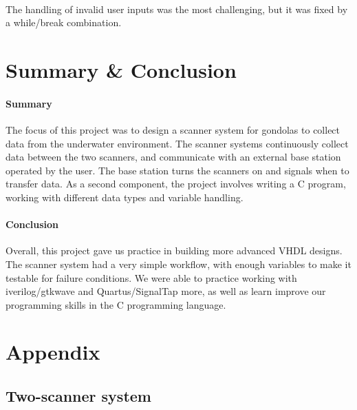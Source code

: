 \documentclass{article}
\begin{document}
  \paragraph{} The handling of invalid user inputs was the most challenging, but it was fixed by a while/break combination.


\section{Summary \& Conclusion}
  \paragraph{Summary} The focus of this project was to design a scanner system for gondolas to collect data from the underwater environment. The scanner systems continuously collect data between the two scanners, and communicate with an external base station operated by the user. The base station turns the scanners on and signals when to transfer data.  As a second component, the project involves writing a C program, working with different data types and variable handling.

  \paragraph{Conclusion} Overall, this project gave us practice in building more advanced VHDL designs. The scanner system had a very simple workflow, with enough variables to make it testable for failure conditions. We were able to practice working with iverilog/gtkwave and Quartus/SignalTap more, as well as learn improve our programming skills in the C programming language.


\section{Appendix}
  \subsection{Two-scanner system}
\end{document}
